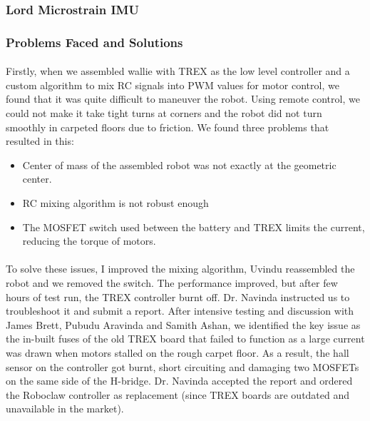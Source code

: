 \subsubsection{Lord Microstrain IMU}


\newpage
\subsubsection{Problems Faced and Solutions}

\paragraph{}
Firstly, when we assembled wallie with TREX as the low level controller and a custom algorithm to mix RC signals into PWM values for motor control, we found that it was quite difficult to maneuver the robot. Using remote control, we could not make it take tight turns at corners and the robot did not turn smoothly in carpeted floors due to friction. We found three problems that resulted in this:

\begin{itemize}
    \item Center of mass of the assembled robot was not exactly at the geometric center.
    \item RC mixing algorithm is not robust enough
    \item The MOSFET switch used between the battery and TREX limits the current, reducing the torque of motors.
\end{itemize} 

\paragraph{}
To solve these issues, I improved the mixing algorithm, Uvindu reassembled the robot and we removed the switch. The performance improved, but after few hours of test run, the TREX controller burnt off. Dr. Navinda instructed us to troubleshoot it and submit a report. After intensive testing and discussion with James Brett, Pubudu Aravinda and Samith Ashan, we identified the key issue as the in-built fuses of the old TREX board that failed to function as a large current was drawn when motors stalled on the rough carpet floor. As a result, the hall sensor on the controller got burnt, short circuiting and damaging two MOSFETs on the same side of the H-bridge. Dr. Navinda accepted the report and ordered the Roboclaw controller as replacement (since TREX boards are outdated and unavailable in the market). 

